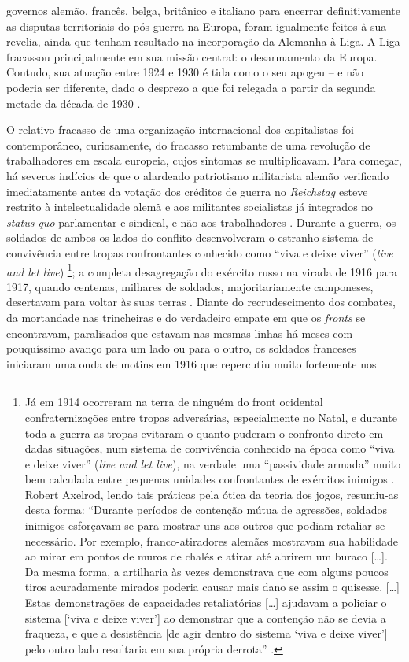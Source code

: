 governos alemão, francês, belga, britânico e italiano para encerrar definitivamente as disputas territoriais do pós-guerra na Europa, foram igualmente feitos à sua revelia, ainda que tenham resultado na incorporação da Alemanha à Liga. A Liga fracassou principalmente em sua missão central: o desarmamento da Europa. Contudo, sua atuação entre 1924 e 1930 é tida como o seu apogeu  -- e não poderia ser diferente, dado o desprezo a que foi relegada a partir da segunda metade da década de 1930 \cite{carr_relations_1937,carr_crisis_1981}.

O relativo fracasso de uma organização internacional dos capitalistas foi contemporâneo, curiosamente, do fracasso retumbante de uma revolução de trabalhadores em escala europeia, cujos sintomas se multiplicavam. Para começar, há severos indícios de que o alardeado patriotismo militarista alemão verificado imediatamente antes da votação dos créditos de guerra no \textit{Reichstag} esteve restrito à intelectualidade alemã e aos militantes socialistas já integrados no \textit{status quo} parlamentar e sindical, e não aos trabalhadores \cite{broue_german_2005,watson_german_2011}. Durante a guerra, os soldados de ambos os lados do conflito desenvolveram o estranho sistema de convivência entre tropas confrontantes conhecido como ``viva e deixe viver'' (\textit{live and let live}) \cite{ashworth_live_1980}\footnote{Já em 1914 ocorreram na terra de ninguém do front ocidental confraternizações entre tropas adversárias, especialmente no Natal, e durante toda a guerra as tropas evitaram o quanto puderam o confronto direto em dadas situações, num sistema de convivência conhecido na época como ``viva e deixe viver'' (\textit{live and let live}), na verdade uma ``passividade armada'' muito bem calculada entre pequenas unidades confrontantes de exércitos inimigos \cite{ashworth_live_1980}. Robert Axelrod, lendo tais práticas pela ótica da teoria dos jogos, resumiu-as desta forma: ``Durante períodos de contenção mútua de agressões, soldados inimigos esforçavam-se para mostrar uns aos outros que podiam retaliar se necessário. Por exemplo, franco-atiradores alemães mostravam sua habilidade ao mirar em pontos de muros de chalés e atirar até abrirem um buraco [\dots]. Da mesma forma, a artilharia às vezes demonstrava que com alguns poucos tiros acuradamente mirados poderia causar mais dano se assim o quisesse. [\dots] Estas demonstrações de capacidades retaliatórias [\dots] ajudavam a policiar o sistema [‘viva e deixe viver’] ao demonstrar que a contenção não se devia a fraqueza, e que a desistência [de agir dentro do sistema ‘viva e deixe viver’] pelo outro lado resultaria em sua própria derrota'' \cite[p.~79-80]{axelrod_cooperation_2006}.}; a completa desagregação do exército russo na virada de 1916 para 1917, quando centenas, milhares de soldados, majoritariamente camponeses, desertavam para voltar às suas terras \cite{trotsky_revrus01_1977}. Diante do recrudescimento dos combates, da mortandade nas trincheiras e do verdadeiro empate em que os \textit{fronts} se encontravam, paralisados que estavam nas mesmas linhas há meses com pouquíssimo avanço para um lado ou para o outro, os soldados franceses iniciaram uma onda de motins em 1916 \cite{masson_franceses_2008} que repercutiu muito fortemente nos 